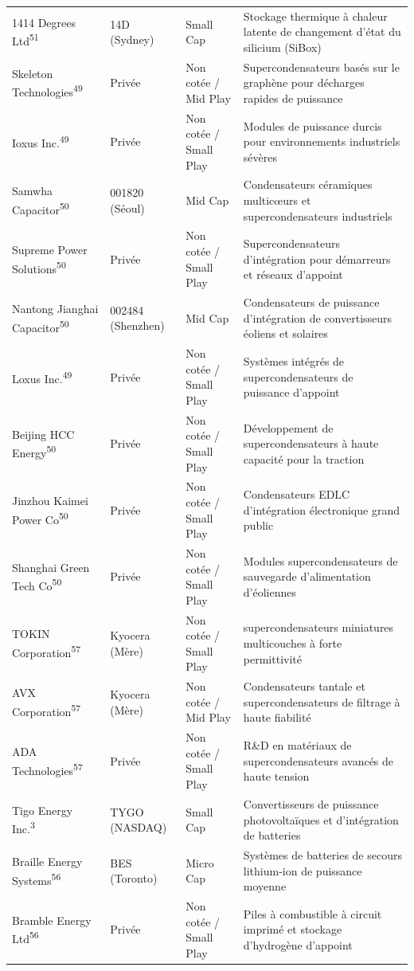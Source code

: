 \documentclass[11pt,a4paper]{article}
\begin{document}
\begin{longtable}{p{3cm} p{3.5cm} p{3cm} p{5cm}}
1414 Degrees Ltd\textsuperscript{51} & 14D (Sydney) & Small Cap & Stockage thermique à chaleur latente de changement d'état du silicium (SiBox) \\
Skeleton Technologies\textsuperscript{49} & Privée & Non cotée / Mid Play & Supercondensateurs basés sur le graphène pour décharges rapides de puissance \\
Ioxus Inc.\textsuperscript{49} & Privée & Non cotée / Small Play & Modules de puissance durcis pour environnements industriels sévères \\
Samwha Capacitor\textsuperscript{50} & 001820 (Séoul) & Mid Cap & Condensateurs céramiques multicœurs et supercondensateurs industriels \\
Supreme Power Solutions\textsuperscript{50} & Privée & Non cotée / Small Play & Supercondensateurs d'intégration pour démarreurs et réseaux d'appoint \\
Nantong Jianghai Capacitor\textsuperscript{50} & 002484 (Shenzhen) & Mid Cap & Condensateurs de puissance d'intégration de convertisseurs éoliens et solaires \\
Loxus Inc.\textsuperscript{49} & Privée & Non cotée / Small Play & Systèmes intégrés de supercondensateurs de puissance d'appoint \\
Beijing HCC Energy\textsuperscript{50} & Privée & Non cotée / Small Play & Développement de supercondensateurs à haute capacité pour la traction \\
Jinzhou Kaimei Power Co\textsuperscript{50} & Privée & Non cotée / Small Play & Condensateurs EDLC d'intégration électronique grand public \\
Shanghai Green Tech Co\textsuperscript{50} & Privée & Non cotée / Small Play & Modules supercondensateurs de sauvegarde d'alimentation d'éoliennes \\
TOKIN Corporation\textsuperscript{57} & Kyocera (Mère) & Non cotée / Small Play & supercondensateurs miniatures multicouches à forte permittivité \\
AVX Corporation\textsuperscript{57} & Kyocera (Mère) & Non cotée / Mid Play & Condensateurs tantale et supercondensateurs de filtrage à haute fiabilité \\
ADA Technologies\textsuperscript{57} & Privée & Non cotée / Small Play & R\&D en matériaux de supercondensateurs avancés de haute tension \\
Tigo Energy Inc.\textsuperscript{3} & TYGO (NASDAQ) & Small Cap & Convertisseurs de puissance photovoltaïques et d'intégration de batteries \\
Braille Energy Systems\textsuperscript{56} & BES (Toronto) & Micro Cap & Systèmes de batteries de secours lithium-ion de puissance moyenne \\
Bramble Energy Ltd\textsuperscript{56} & Privée & Non cotée / Small Play & Piles à combustible à circuit imprimé et stockage d'hydrogène d'appoint \\
\bottomrule
\end{longtable}
\end{document}
